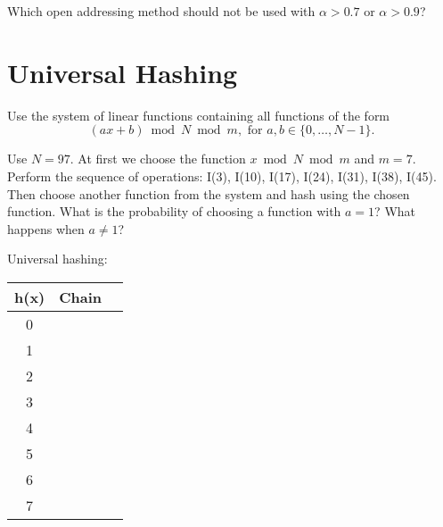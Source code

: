 \vspace{3cm}
\noindent Which open addressing method should not be used with $\alpha > 0.7$ or $\alpha > 0.9$?

\clearpage

\section*{Universal Hashing}
Use the system of linear functions containing all functions of the form \[(ax + b) \bmod N \bmod m, \text{ for } a, b \in \{0, \dots, N - 1\}. \]

Use $N = 97$. At first we choose the function $x \bmod N \bmod m$ and $m = 7$. Perform the sequence of operations: I(3), I(10), I(17), I(24), I(31), I(38), I(45). Then choose another function from the system and hash using the chosen function. What is the probability of choosing a function with $a = 1$? What happens when $a \neq 1$?

\vspace{0.5cm}
Universal hashing:

\begin{tabular}{|c|c|c|}
\hline
h(x) & Chain \\ \hline\hline
0 & \hspace{7cm} \\ \hline
1 & \hspace{7cm} \\ \hline
2 & \hspace{7cm} \\ \hline
3 & \hspace{7cm} \\ \hline
4 & \hspace{7cm} \\ \hline
5 & \hspace{7cm} \\ \hline
6 & \hspace{7cm} \\ \hline
7 & \hspace{7cm} \\ \hline
\end{tabular}
